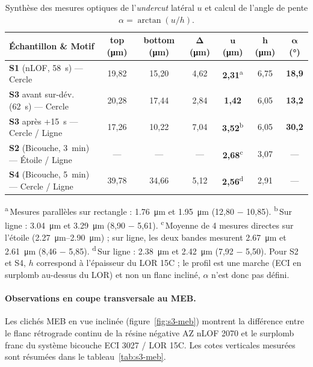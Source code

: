 \begin{table}[H]
  \centering\footnotesize
  \setlength{\tabcolsep}{3.5pt}
  \caption{Synthèse des mesures optiques de l'\emph{undercut} latéral $u$ et calcul de l'angle de pente $\alpha = \arctan(u/h)$.}
  \label{tab:s3-optique}
  \begin{tabularx}{\linewidth}{@{}X c c c c c c@{}}
    \toprule
    \textbf{Échantillon \& Motif} & \textbf{top} (\unit{\micro\metre}) & \textbf{bottom} (\unit{\micro\metre}) & $\mathbf{\Delta}$ (\unit{\micro\metre}) & $\mathbf{u}$ (\unit{\micro\metre}) & $\mathbf{h}$ (\unit{\micro\metre}) & $\mathbf{\alpha}$ (\unit{\degree}) \\
    \midrule
    \textbf{S1} (nLOF, \qty{58}{\second}) --- Cercle & 19,82 & 15,20 & 4,62 & \textbf{2,31}\textsuperscript{a} & 6,75 & \textbf{18,9} \\
    \textbf{S3} avant sur-dév. (\qty{62}{\second}) --- Cercle & 20,28 & 17,44 & 2,84 & \textbf{1,42} & 6,05 & \textbf{13,2} \\
    \textbf{S3} après +\qty{15}{\second} --- Cercle / Ligne & 17,26 & 10,22 & 7,04 & \textbf{3,52}\textsuperscript{b} & 6,05 & \textbf{30,2} \\
    \textbf{S2} (Bicouche, \qty{3}{\minute}) --- Étoile / Ligne & --- & --- & --- & \textbf{2,68}\textsuperscript{c} & 3,07 & --- \\
    \textbf{S4} (Bicouche, \qty{5}{\minute}) --- Cercle / Ligne & 39,78 & 34,66 & 5,12 & \textbf{2,56}\textsuperscript{d} & 2,91 & --- \\
    \bottomrule
  \end{tabularx}
  \vspace{2pt}
  \raggedright\scriptsize
  \textsuperscript{a}\,Mesures parallèles sur rectangle : \qty{1,76}{\micro\metre} et \qty{1,95}{\micro\metre} (12,80 $-$ 10,85).
  \textsuperscript{b}\,Sur ligne : \qty{3,04}{\micro\metre} et \qty{3,29}{\micro\metre} (8,90 $-$ 5,61).
  \textsuperscript{c}\,Moyenne de 4 mesures directes sur l'étoile (\qtyrange{2,27}{2,90}{\micro\metre}) ; sur ligne, les deux bandes mesurent \qty{2,67}{\micro\metre} et \qty{2,61}{\micro\metre} (8,46 $-$ 5,85).
  \textsuperscript{d}\,Sur ligne : \qty{2,38}{\micro\metre} et \qty{2,42}{\micro\metre} (7,92 $-$ 5,50). Pour S2 et S4, $h$ correspond à l'épaisseur du LOR 15C ; le profil est une marche (ECI en surplomb au-dessus du LOR) et non un flanc incliné, $\alpha$ n'est donc pas défini.
\end{table}

\paragraph{Observations en coupe transversale au MEB.}
Les clichés MEB en vue inclinée (figure~\ref{fig:s3-meb}) montrent la différence entre le flanc rétrograde continu de la résine négative AZ nLOF 2070 et le surplomb franc du système bicouche ECI 3027 / LOR 15C. Les cotes verticales mesurées sont résumées dans le tableau~\ref{tab:s3-meb}.

